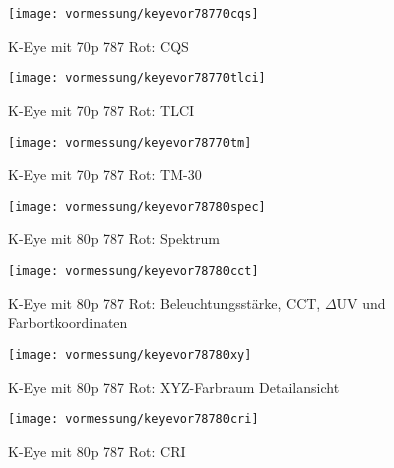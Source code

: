 \documentclass[pagesize,paper=A4,fontsize=12pt,utf8,numbers=noenddot,bibliography=totoc,listof=totoc,DIV=11,BCOR=1mm]{scrreprt}
\begin{document}
\begin{figure}[htp]     %
\centering
\texttt{[image: vormessung/keyevor78770cqs]} 
\caption {K-Eye mit 70p 787 Rot: CQS} 
\end{figure}

\begin{figure}[htp]     %
\centering
\texttt{[image: vormessung/keyevor78770tlci]} 
\caption {K-Eye mit 70p 787 Rot: TLCI} 
\end{figure}

\begin{figure}[htp]     %
\centering
\texttt{[image: vormessung/keyevor78770tm]} 
\caption {K-Eye mit 70p 787 Rot: TM-30} 
\end{figure}




\begin{figure}[htp]     %
\centering
\texttt{[image: vormessung/keyevor78780spec]} 
\caption {K-Eye mit 80p 787 Rot: Spektrum} 
\end{figure}

\begin{figure}[htp]     %
\centering
\texttt{[image: vormessung/keyevor78780cct]} 
\caption {K-Eye mit 80p 787 Rot: Beleuchtungsstärke, CCT, $\Delta$UV und Farbortkoordinaten} 
\end{figure}

\begin{figure}[htp]     %
\centering
\texttt{[image: vormessung/keyevor78780xy]} 
\caption {K-Eye mit 80p 787 Rot: XYZ-Farbraum Detailansicht} 
\end{figure}

\begin{figure}[htp]     %
\centering
\texttt{[image: vormessung/keyevor78780cri]} 
\caption {K-Eye mit 80p 787 Rot: CRI} 
\end{figure}
\end{document}
